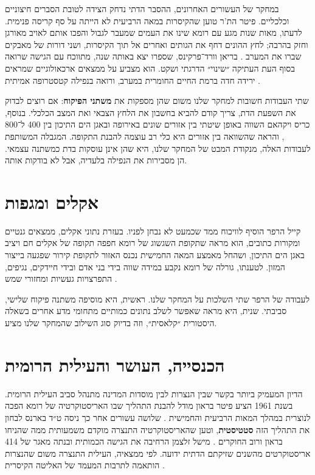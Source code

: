 במחקר של העשורים האחרונים, ההסבר הדתי נדחק הצידה לטובת הסברים חיצוניים וכלכליים. פיטר הת'ר טוען שהקיסרות במאה הרביעית לא הייתה על סף קריסה פנימית. לדעתו, מאות שנות מגע עם רומא שינו את העמים שמעבר לגבול והפכו אותם לאויב מאורגן וחזק בהרבה; לחץ ההונים דחף את הגותים ואחרים אל תוך הקיסרות, ושני דורות של מאבקים שברו את המערב \cite{heather2005fall}. בריאן וורד־פרקינס, שספרו יצא באותה שנה, מתווכח עם הגישה שרואה בסוף העת העתיקה ״שינוי״ הדרגתי ושקט. הוא מצביע על ממצאים ארכאולוגיים שמראים ירידה חדה ברמת החיים החומרית במערב, ורואה בנפילה קטסטרופה אמיתית \cite{wardperkins2005fall}.

שתי העבודות חשובות למחקר שלנו משום שהן מספקות את \textbf{משתני הפיקוח}: אם רוצים לבדוק את השפעת הדת, צריך קודם להביא בחשבון את הלחץ הצבאי ואת המצב הכלכלי. בנוסף, כריס ויקהאם השווה באופן שיטתי בין אזורים שונים באירופה ובאגן הים התיכון בין 400 ל־800 \cite{wickham2005framing}, והראה שהשוואה בין אזורים היא כלי רב עוצמה להבנת התקופה. המגבלה המשותפת לעבודות האלה, מנקודת המבט של המחקר שלנו, היא שהן אינן עוסקות בדת כמשתנה עצמאי. הן מסבירות את הנפילה בלעדיה, אבל לא בודקות אותה.

\section{אקלים ומגפות}
\label{sec:lit-climate}

קייל הרפר הוסיף לוויכוח ממד שכמעט לא נבחן לפניו. בעזרת נתוני אקלים, ממצאים גנטיים ומקורות כתובים, הוא מראה שתקופת השגשוג של רומא חפפה תקופה של אקלים חם ויציב באגן הים התיכון, ושהחל מאמצע המאה החמישית נכנס האזור לתקופת קירור שפגעה בייצור המזון. לטענתו, גורלה של רומא נקבע במידה שווה בידי בני אדם ובידי חיידקים, נגיפים, התפרצויות געשיות ומחזורי שמש \cite{harper2017fate}.

לעבודה של הרפר שתי השלכות על המחקר שלנו. ראשית, היא מוסיפה משתנה פיקוח שלישי, סביבתי. שנית, היא מראה שאפשר לשלב נתונים כמותיים מתחומי מדע אחרים בשאלה היסטורית ״קלאסית״, וזה בדיוק סוג השילוב שהמחקר שלנו מציע.

\section{הכנסייה, העושר והעילית הרומית}
\label{sec:lit-wealth}

הדיון המעמיק ביותר בקשר שבין הנצרות לבין מוסדות המדינה מתנהל סביב העילית הרומית. בשנת 1961 הציע פיטר בראון מודל להבנת התהליך שבו האריסטוקרטיה של רומא הפכה לנוצרית במהלך המאות הרביעית והחמישית \cite{brown1961aspects}. שלושה עשורים אחר כך ניסה ט״ד בארנס לבחון את התהליך הזה \textbf{סטטיסטית}, וטען שהאריסטוקרטיה התנצרה מוקדם משמעותית ממה שהניחו בראון ורוב החוקרים \cite{barnes1995statistics}. מישל זלצמן הרחיבה את הגישה הכמותית ובנתה מאגר של 414 אריסטוקרטים מהשנים  שזיקתם הדתית ידועה. לפי ממצאיה, העילית התנצרה משום שהנצרות הותאמה לתרבות המעמד של האליטה הקיסרית \cite{salzman2002making}.

